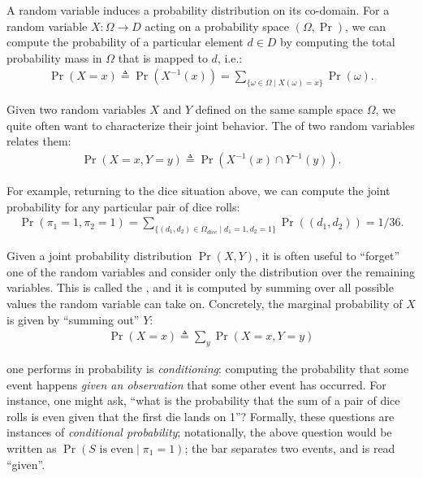 \documentclass{tufte-handout}
\begin{document}
A random variable induces a probability distribution on its co-domain. For a
random variable $X : \Omega \rightarrow D$ acting on a probability space
$(\Omega, \Pr)$, we can compute the probability of a particular element $d \in
D$ by computing the total probability mass in $\Omega$ that is mapped to $d$,
i.e.:
\begin{align}
    \Pr(X = x) \triangleq \Pr(X^{-1}(x)) = \sum_{\{\omega \in \Omega \mid X(\omega) = x\}} \Pr(\omega).
\end{align}

Given two random variables $X$ and $Y$ defined on the same sample space
$\Omega$, we quite often want to characterize their joint behavior. The 
 of two random variables relates them:
\begin{align}
    \Pr(X=x, Y=y) \triangleq \Pr(X^{-1}(x) \cap Y^{-1}(y)).
\end{align}


For example, returning to the dice situation above, we can compute the 
joint probability for any particular pair of dice rolls:
\begin{align*}
    \Pr(\pi_1 = 1, \pi_2 = 1) = \sum_{\{(d_1, d_2) \in \Omega_{dice} \mid d_1 = 1, d_2 = 1 \}} \Pr((d_1, d_2)) = 1/36.
\end{align*}

Given a joint probability distribution $\Pr(X, Y)$, it is often useful to ``forget'' 
one of the random variables and consider only the distribution over the remaining 
variables. This is called the , and it is computed by summing 
over all possible values the random variable can take on. Concretely, the
marginal probability of $X$ is given by ``summing out'' $Y$:
\begin{align}
    \Pr(X = x) \triangleq \sum_{y} \Pr(X=x, Y=y)
    \label{eq:marg}
\end{align}

 one performs in probability is
\emph{conditioning}: computing the probability that some event happens
\emph{given an observation} that some other event has occurred. For instance,
one might ask, ``what is the probability that the sum of a pair of dice rolls
is even given that the first die lands on 1''? Formally, these questions are instances
of \emph{conditional probability}; notationally, the above question would be 
written as $\Pr( S \text { is even} \mid \pi_1 = 1)$; the bar separates two
events, and is read ``given''.
\end{document}
